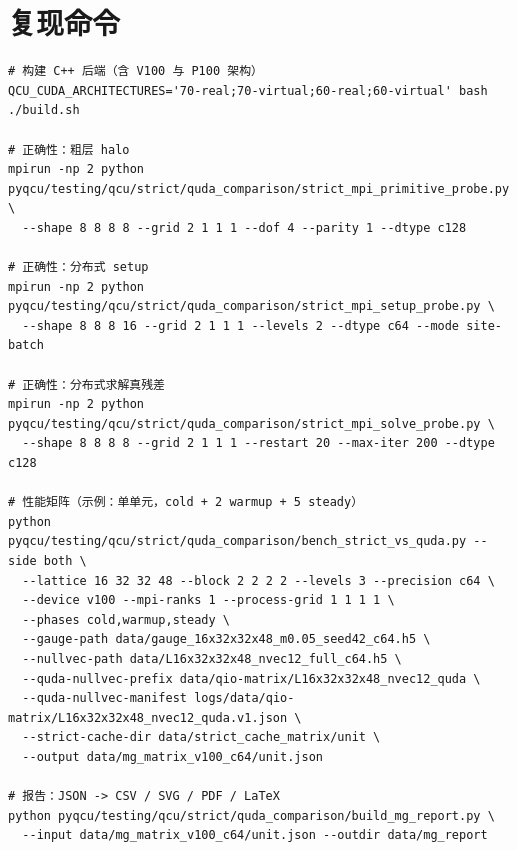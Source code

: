 \documentclass[UTF8,a4paper,11pt]{ctexart}
\begin{document}
\section{复现命令}

\begin{lstlisting}[basicstyle=\ttfamily\small,breaklines=true]
# 构建 C++ 后端（含 V100 与 P100 架构）
QCU_CUDA_ARCHITECTURES='70-real;70-virtual;60-real;60-virtual' bash ./build.sh

# 正确性：粗层 halo
mpirun -np 2 python pyqcu/testing/qcu/strict/quda_comparison/strict_mpi_primitive_probe.py \
  --shape 8 8 8 8 --grid 2 1 1 1 --dof 4 --parity 1 --dtype c128

# 正确性：分布式 setup
mpirun -np 2 python pyqcu/testing/qcu/strict/quda_comparison/strict_mpi_setup_probe.py \
  --shape 8 8 8 16 --grid 2 1 1 1 --levels 2 --dtype c64 --mode site-batch

# 正确性：分布式求解真残差
mpirun -np 2 python pyqcu/testing/qcu/strict/quda_comparison/strict_mpi_solve_probe.py \
  --shape 8 8 8 8 --grid 2 1 1 1 --restart 20 --max-iter 200 --dtype c128

# 性能矩阵（示例：单单元，cold + 2 warmup + 5 steady）
python pyqcu/testing/qcu/strict/quda_comparison/bench_strict_vs_quda.py --side both \
  --lattice 16 32 32 48 --block 2 2 2 2 --levels 3 --precision c64 \
  --device v100 --mpi-ranks 1 --process-grid 1 1 1 1 \
  --phases cold,warmup,steady \
  --gauge-path data/gauge_16x32x32x48_m0.05_seed42_c64.h5 \
  --nullvec-path data/L16x32x32x48_nvec12_full_c64.h5 \
  --quda-nullvec-prefix data/qio-matrix/L16x32x32x48_nvec12_quda \
  --quda-nullvec-manifest logs/data/qio-matrix/L16x32x32x48_nvec12_quda.v1.json \
  --strict-cache-dir data/strict_cache_matrix/unit \
  --output data/mg_matrix_v100_c64/unit.json

# 报告：JSON -> CSV / SVG / PDF / LaTeX
python pyqcu/testing/qcu/strict/quda_comparison/build_mg_report.py \
  --input data/mg_matrix_v100_c64/unit.json --outdir data/mg_report
\end{lstlisting}
\end{document}
